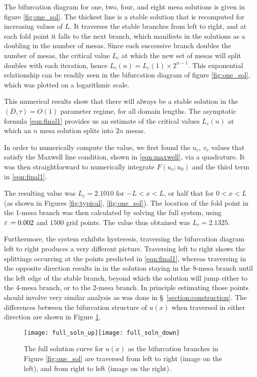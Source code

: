The bifurcation diagram for one, two, four, and eight mesa solutions is given in figure \ref{fig:one_sol}. The thickest line is a stable solution that is recomputed for increasing values of $L$. It traverses the stable branches from left to right, and at each fold point it falls to the next branch, which manifests in the solutions as a doubling in the number of mesas. Since each successive branch doubles the number of mesas, the critical value $L_c$ at which the new set of mesas will split doubles with each iteration, hence $L_c(n)=L_c(1)\times 2^{n-1}$. This exponential relationship can be readily seen in the bifurcation diagram of figure \ref{fig:one_sol}, which was plotted on a logarithmic scale.

This numerical results show that there will always be a stable solution in the $(D,\tau)=O(1)$ parameter regime, for all domain lengths. The asymptotic formula \eqref{eqn:final1} provides us an estimate of the critical values $L_c(n)$ at which an $n$ mesa solution splits into $2n$ mesas. 

In order to numerically compute the value, we first found the $u_c$, $v_c$ values that satisfy the Maxwell line condition, shown in \eqref{eqn:maxwell}, via a quadrature. It was then straightforward to numerically integrate $F(u_c;u_0)$ and the third term in \eqref{eqn:final1}. 

The resulting value was $L_c = 2.1010$ for $-L<x<L$, or half that for $0<x<L$ (as shown in Figures \ref{fig:typical}, \ref{fig:one_sol}). The location of the fold point in the 1-mesa branch was then calculated by solving the full system, using $\varepsilon\,=0.002$ and $1500$ grid points. The value thus obtained was $L_c = 2.1325$.

Furthermore, the system exhibits hysteresis, traversing the bifurcation diagram left to right produces a very different picture. Traversing left to right shows the splittings occurring at the points predicted in \eqref{eqn:final1}, whereas traversing in the opposite direction results in in the solution staying in the 8-mesa branch until the left edge of the stable branch, beyond which the solution will jump either to the 4-mesa branch, or to the 2-mesa branch. In principle estimating those points should involve very similar analysis as was done in \S~\ref{section:construction}. The differences between the bifurcation structure of $u(x)$ when traversed in either direction are shown in Figure \ref{fig:up_down}.
% 
\begin{figure}[htb]
\begin{center}
\texttt{[image: full\_soln\_up]}\texttt{[image: full\_soln\_down]}
\caption{The full solution curve for $u(x)$ as the bifurcation branches in Figure \ref{fig:one_sol} are traversed from left to right (image on the left), and from right to left (image on the right).}
\label{fig:up_down}
\end{center}
\end{figure}
% 

